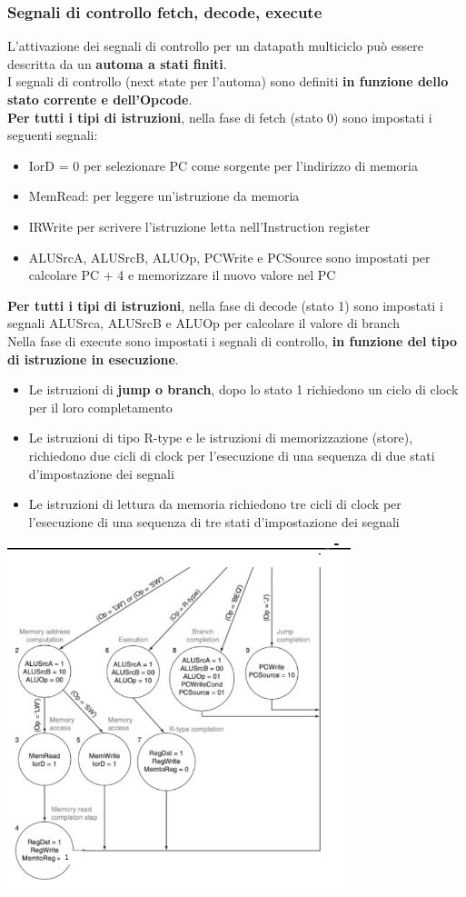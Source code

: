 \documentclass[12pt, a4paper, openany]{book}
\begin{document}
\subsubsection{Segnali di controllo fetch, decode, execute}
L'attivazione dei segnali di controllo per un datapath multiciclo può essere descritta
da un \textbf{automa a stati finiti}.
\\ I segnali di controllo (next state per l'automa) sono definiti \textbf{in funzione dello stato
corrente e dell'Opcode}.
\\ \textbf{Per tutti i tipi di istruzioni}, nella fase di fetch (stato 0) sono impostati i
seguenti segnali:
\begin{itemize}
    \item IorD = 0 per selezionare PC come sorgente per l'indirizzo di memoria
    \item MemRead: per leggere un'istruzione da memoria
    \item IRWrite per scrivere l'istruzione letta nell'Instruction register
    \item ALUSrcA, ALUSrcB, ALUOp, PCWrite e PCSource sono impostati per calcolare
    PC + 4 e memorizzare il nuovo valore nel PC
\end{itemize}
\textbf{Per tutti i tipi di istruzioni}, nella fase di decode (stato 1) sono impostati
i segnali ALUSrca, ALUSrcB e ALUOp per calcolare il valore di branch
\\ Nella fase di execute sono impostati i segnali di controllo, \textbf{in funzione del tipo di
istruzione in esecuzione}.
\begin{itemize}
    \item Le istruzioni di \textbf{jump o branch}, dopo lo stato 1 richiedono un ciclo di clock per
    il loro completamento
    \item Le istruzioni di tipo R-type e le istruzioni di memorizzazione (store), richiedono
    due cicli di clock per l'esecuzione di una sequenza di due stati d'impostazione dei segnali
    \item Le istruzioni di lettura da memoria richiedono tre cicli di clock per l'esecuzione
    di una sequenza di tre stati d'impostazione dei segnali
\end{itemize}
\begin{center}
    \includegraphics[width=100mm, scale=0.5]{Datapath automa.png}
\end{center}
\end{document}

